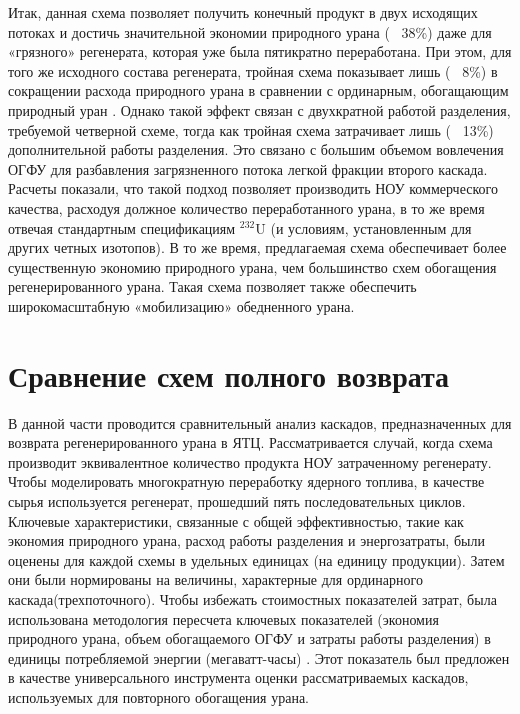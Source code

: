 Итак, данная схема позволяет получить конечный продукт в двух исходящих потоках и достичь значительной экономии природного урана (~ 38\%) даже для «грязного» регенерата, которая уже была пятикратно переработана.
При этом, для того же исходного состава регенерата, тройная схема показывает лишь (~ 8\%) в сокращении расхода природного урана в сравнении с ординарным, обогащающим природный уран \cite{smirnovObogashchenieRegenerirovannogoUrana2018}.
Однако такой эффект связан с двухкратной работой разделения, требуемой четверной схеме, тогда как тройная схема затрачивает лишь (~ 13\%) дополнительной работы разделения.
Это связано с большим объемом вовлечения ОГФУ для разбавления загрязненного потока легкой фракции второго каскада.
Расчеты показали, что такой подход позволяет производить НОУ коммерческого качества, расходуя должное количество переработанного урана, в то же время отвечая стандартным спецификациям $^{232}$U (и условиям, установленным для других четных изотопов).
В то же время, предлагаемая схема обеспечивает более существенную экономию природного урана, чем большинство схем обогащения регенерированного урана.
Такая схема позволяет также обеспечить широкомасштабную «мобилизацию» обедненного урана.

\section{Сравнение схем полного возврата}

В данной части проводится сравнительный анализ каскадов, предназначенных для возврата регенерированного урана в ЯТЦ.
Рассматривается случай, когда схема производит эквивалентное количество продукта НОУ затраченному регенерату.
Чтобы моделировать многократную переработку ядерного топлива, в качестве сырья используется регенерат, прошедший пять последовательных циклов.
Ключевые характеристики, связанные с общей эффективностью, такие как экономия природного урана, расход работы разделения и энергозатраты, были оценены для каждой схемы в удельных единицах (на единицу продукции).
Затем они были нормированы на величины, характерные для ординарного каскада(трехпоточного).
Чтобы избежать стоимостных показателей затрат, была использована методология пересчета ключевых показателей (экономия природного урана, объем обогащаемого ОГФУ и затраты работы разделения) в единицы потребляемой энергии (мегаватт-часы)  \cite{rodionovaAnalizTehnikoekonomicheskihHarakteristik2019}.
Этот показатель был предложен в качестве универсального инструмента оценки рассматриваемых каскадов, используемых для повторного обогащения урана.


